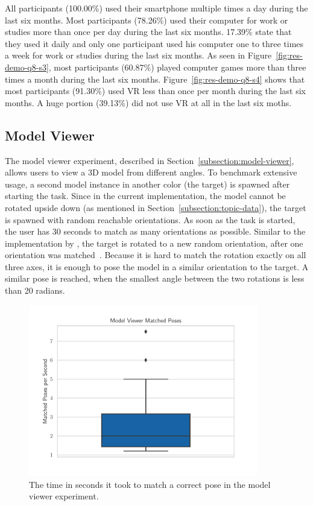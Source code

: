 All participants (100.00\%) used their smartphone multiple times a day during the last six months. Most participants (78.26\%) used their computer for work or studies more than once per day during the last six months. 17.39\% state that they used it daily and only one participant used his computer one to three times a week for work or studies during the last six months. As seen in Figure~\ref{fig:res-demo-q8-s3}, most participants (60.87\%) played computer games more than three times a month during the last six months. Figure~\ref{fig:res-demo-q8-s4} shows that most participants (91.30\%) used \ac{VR} less than once per month during the last six months. A huge portion (39.13\%) did not use \ac{VR} at all in the last six moths.


\subsection{Model Viewer}\label{section:eval-res-mv}

The model viewer experiment, described in Section~\ref{subsection:model-viewer}, allows users to view a \ac{3D} model from different angles. To benchmark extensive usage, a second model instance in another color (the target) is spawned after starting the task. Since in the current implementation, the model cannot be rotated upside down (as mentioned in Section~\ref{subsection:topic-data}), the target is spawned with random reachable orientations.
As soon as the task is started, the user has 30 seconds to match as many orientations as possible. Similar to the implementation by \citeauthor{Katzakis.2010}, the target is rotated to a new random orientation, after one orientation was matched~\cite[140]{Katzakis.2010}.
Because it is hard to match the rotation exactly on all three axes, it is enough to pose the model in a similar orientation to the target. A similar pose is reached, when the smallest angle between the two rotations is less than 20 radians.

\begin{figure}[H]
  \centering
  \includegraphics[width=10cm]{figures/evaluation/eval_exp_mv.pdf}
  \caption[Model viewer experiment results]{The time in seconds it took to match a correct pose in the model viewer experiment.}\label{fig:eval-exp-mv}
\end{figure}

